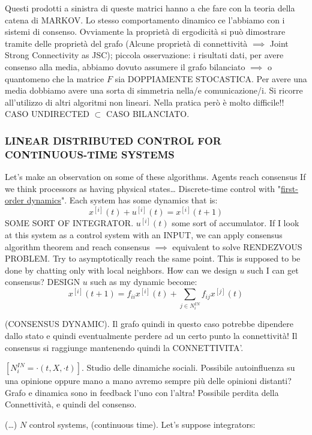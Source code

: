 Questi prodotti a sinistra di queste matrici hanno a che fare con la teoria della catena di MARKOV. Lo stesso comportamento dinamico ce l'abbiamo con i sistemi di consenso. Ovviamente la proprietà di ergodicità si può dimostrare tramite delle proprietà del grafo (Alcune proprietà di connettività $\implies$ Joint Strong Connectivity as JSC); piccola osservazione: i risultati dati, per avere consenso alla media, abbiamo dovuto assumere il grafo bilanciato $\implies$ o quantomeno che la matrice $F$ sia DOPPIAMENTE STOCASTICA. Per avere una media dobbiamo avere una sorta di simmetria nella/e comunicazione/i. Si ricorre all'utilizzo di altri algoritmi non lineari. Nella pratica però è molto difficile!! CASO UNDIRECTED $\subset$ CASO BILANCIATO.

\subsubsection{LINEAR DISTRIBUTED CONTROL FOR CONTINUOUS-TIME SYSTEMS}

Let's make an observation on some of these algorithms. Agents reach consensus If we think processors as having physical states\dots 
Discrete-time control with "\underline{first-order dynamics}". Each system has some dynamics that is:
\[
	x^{[i]}(t) + u^{[i]}(t) = x^{[i]}(t+1)
\]
SOME SORT OF INTEGRATOR. $u^{[i]}(t)$ some sort of accumulator. If I look at this system as a control system with an INPUT, we can apply consensus algorithm theorem and reach consensus $\implies$ equivalent to solve RENDEZVOUS PROBLEM. Try to asymptotically reach the same point. This is supposed to be done by chatting only with local neighbors. How can we design $u$ such I can get consensus?
DESIGN $u$ such as my dynamic become:
\[ 
	x^{[i]}(t+1) = f_{ii}x^{[i]}(t) + \sum_{j\in N_i^{IN}}{f_{ij}x^{[j]}(t)}
\]	

(CONSENSUS DYNAMIC). Il grafo quindi in questo caso potrebbe dipendere dallo stato e quindi eventualmente perdere ad un certo punto la connettività! Il consensus si raggiunge mantenendo quindi la CONNETTIVITA'.

$[N_i^{IN} = \mathord{\cdot}(t,X,\mathord{\cdot}t)]$. Studio delle dinamiche sociali. Possibile autoinfluenza su una opinione oppure mano a mano avremo sempre più delle opinioni distanti? Grafo e dinamica sono in feedback l'uno con l'altra! Possibile perdita della Connettività, e quindi del consenso.

(\dots) $N$ control systems, (continuous time). Let's suppose integrators:

